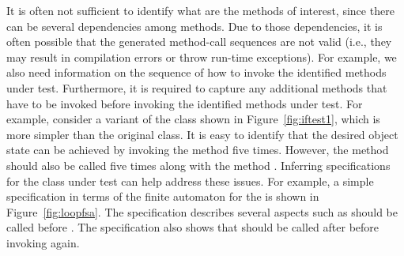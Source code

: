 It is often not sufficient to identify what are the methods of interest, since there can be several dependencies among methods. Due to those dependencies, it is often possible that the generated method-call sequences are not valid (i.e., they may result in compilation errors or throw run-time exceptions). For example, we also need information on the sequence of how to invoke the identified methods under test. Furthermore, it is required to capture any additional methods that have to be invoked before invoking the identified methods under test. For example, consider a variant of the class  shown in Figure~\ref{fig:iftest1}, which is more simpler than the original class. It is easy to identify that the desired object state can be achieved by invoking the method  five times. However, the method  should also be called five times along with the method . Inferring specifications for the class under test can help address these issues. For example, a simple specification in terms of the finite automaton for the  is shown in Figure~\ref{fig:loopfsa}. The specification describes several aspects such as  should be called before . The specification also shows that  should be called after  before invoking  again.

